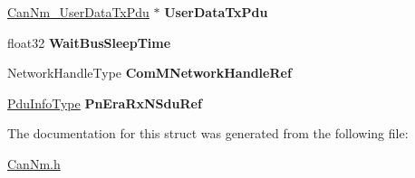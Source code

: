 \begin{DoxyCompactItemize}
\item 
\hyperlink{structCanNm__UserDataTxPdu}{Can\+Nm\+\_\+\+User\+Data\+Tx\+Pdu} $\ast$ {\bfseries User\+Data\+Tx\+Pdu}\hypertarget{structCanNm__ChannelType_ad592f57c26a9334df687c571a3fc27a6}{}\label{structCanNm__ChannelType_ad592f57c26a9334df687c571a3fc27a6}

\item 
float32 {\bfseries Wait\+Bus\+Sleep\+Time}\hypertarget{structCanNm__ChannelType_a7ba7bd3d83aa46f72587b8d158e0670b}{}\label{structCanNm__ChannelType_a7ba7bd3d83aa46f72587b8d158e0670b}

\item 
Network\+Handle\+Type {\bfseries Com\+M\+Network\+Handle\+Ref}\hypertarget{structCanNm__ChannelType_adae836b7dd6ad8592c546a8de7b4712e}{}\label{structCanNm__ChannelType_adae836b7dd6ad8592c546a8de7b4712e}

\item 
\hyperlink{structPduInfoType}{Pdu\+Info\+Type} {\bfseries Pn\+Era\+Rx\+N\+Sdu\+Ref}\hypertarget{structCanNm__ChannelType_a7a66123185ee03407b3660a4a4c03c73}{}\label{structCanNm__ChannelType_a7a66123185ee03407b3660a4a4c03c73}

\end{DoxyCompactItemize}


The documentation for this struct was generated from the following file\+:\begin{DoxyCompactItemize}
\item 
\hyperlink{CanNm_8h}{Can\+Nm.\+h}\end{DoxyCompactItemize}
